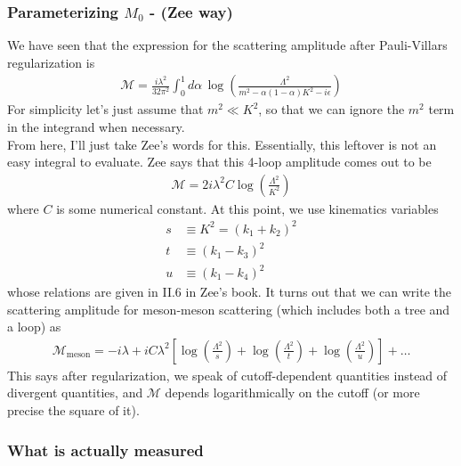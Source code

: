 \documentclass{book}
\theoremstyle{definition}
\newcommand{\f}[2]{\frac{#1}{#2}}
\newcommand{\lp}{\left(}
\newcommand{\rp}{\right)}
\newcommand{\lb}{\left[}
\newcommand{\rb}{\right]}
\begin{document}
\subsubsection{Parameterizing $M_0$ - (Zee way)}

We have seen that the expression for the scattering amplitude after Pauli-Villars regularization is
\begin{align}
\mathcal{M}  = \f{i\lambda^2}{32\pi^2} \int^1_0 d\alpha\,  \log\lp \f{\Lambda^2}{m^2  - \alpha(1 - \alpha)K^2 - i\epsilon} \rp 
\end{align}
For simplicity let's just assume that $m^2 \ll K^2$, so that we can ignore the $m^2$ term in the integrand when necessary. \\


From here, I'll just take Zee's words for this. Essentially, this leftover is not an easy integral to evaluate. Zee says that this 4-loop amplitude comes out to be
\begin{align}
\boxed{\mathcal{M} = 2i\lambda^2C \log \lp \f{\Lambda^2}{K^2} \rp}
\end{align}
where $C$ is some numerical constant. At this point, we use kinematics variables
\begin{align}
s &\equiv K^2 = (k_1 + k_2)^2\\
t &\equiv (k_1 - k_3)^2\\
u &\equiv (k_1 - k_4)^2
\end{align}
whose relations are given in II.6 in Zee's book. It turns out that we can write the scattering amplitude for meson-meson scattering (which includes both a tree and a loop) as
\begin{align}
\boxed{\mathcal{M}_{\text{meson}} = -i\lambda + iC\lambda^2\lb  \log\lp \f{\Lambda^2}{s} \rp + \log\lp \f{\Lambda^2}{t} \rp + \log\lp \f{\Lambda^2}{u} \rp \rb + \dots}
\end{align}
This says after regularization, we speak of cutoff-dependent quantities instead of divergent quantities, and $\mathcal{M}$ depends logarithmically on the cutoff (or more precise the square of it).



















\subsubsection{What is actually measured}
\end{document}
